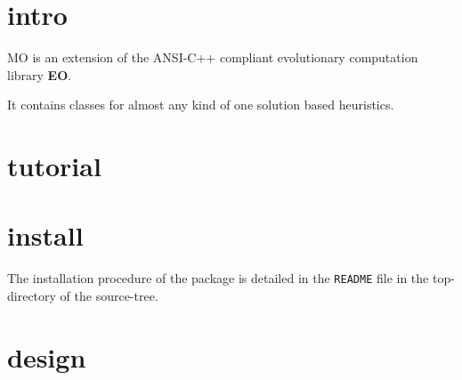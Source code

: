 \section{intro}\label{main_intro}
MO is an extension of the ANSI-C++ compliant evolutionary computation library {\bf EO}. \par
 It contains classes for almost any kind of one solution based heuristics.\section{tutorial}\label{main_tutorial}
\section{install}\label{main_install}
The installation procedure of the package is detailed in the {\tt README} file in the top-directory of the source-tree.\section{design}\label{main_design}
